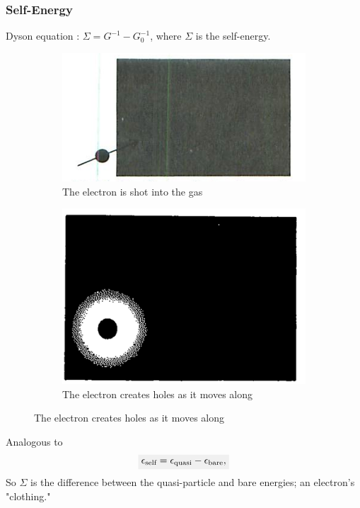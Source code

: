 \documentclass{beamer}
\newcommand{\highlight}[1]{\colorbox{caltechgray!10}{$\displaystyle#1$}}
\begin{document}
\begin{frame}
    \frametitle{\textcolor{caltechorange}{Self-Energy}}
    Dyson equation \autocite{dyson_s_1949}: $\Sigma = G^{-1}-G_0^{-1}$, where $\Sigma$ is the self-energy.
    \begin{figure}
        \caption{Electron gas propagation\autocite{mattuck_guide_1992}}
        \begin{subfigure}{.4\textwidth}
            \centering
            \includegraphics[width=.8\linewidth]{shot.png}
            \caption{The electron is shot into the gas}
            \label{fig:shot}
        \end{subfigure}
        \begin{subfigure}{.4\textwidth}
            \centering
            \includegraphics[width=.8\linewidth]{clothing.png}
            \caption{The electron creates holes as it moves along}
            \label{fig:clothing}
        \end{subfigure}
        \label{fig:propagates}
    \end{figure}
    Analogous to 
    \begin{equation}
        \highlight{\epsilon_{\text{self}} = \epsilon_{\text{quasi}} - \epsilon_{\text{bare}},}
    \end{equation}
    So $\Sigma$ is the difference between the quasi-particle and bare energies; an electron's "clothing."
\end{frame}
\end{document}
